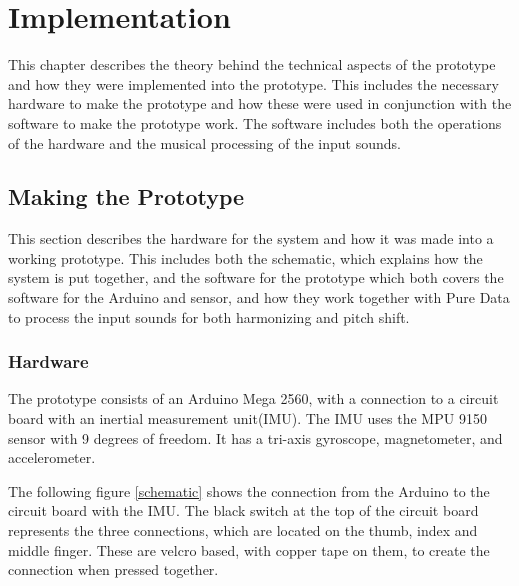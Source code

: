 \chapter{Implementation}

This chapter describes the theory behind the technical aspects of the prototype and how they were implemented into the prototype. This includes the necessary hardware to make the prototype and how these were used in conjunction with the software to make the prototype work. The software includes both the operations of the hardware and the musical processing of the input sounds.

\section{Making the Prototype}

This section describes the hardware for the system and how it was made into a working prototype. This includes both the schematic, which explains how the system is put together, and the software for the prototype which both covers the software for the Arduino and sensor, and how they work together with Pure Data to process the input sounds for both harmonizing and pitch shift.

\subsection{Hardware}

The prototype consists of an Arduino Mega 2560\citep{Arduino}, with a connection to a circuit board with an inertial measurement unit(IMU). 
The IMU uses the MPU 9150 sensor with 9 degrees of freedom\citep{MPU}. It has a tri-axis gyroscope, magnetometer, and accelerometer.

The following figure \ref{schematic} shows the connection from the Arduino to the circuit board with the IMU. The black switch at the top of the circuit board
represents the three connections, which are located on the thumb, index and middle finger. These are velcro based, with copper tape on them, to create the connection when pressed together. \\

\begin{minipage}{\linewidth}%
\label{schematic}
\end{minipage}\\

